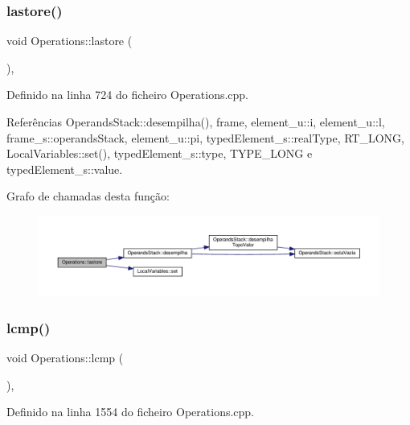 \subsubsection{\texorpdfstring{lastore()}{lastore()}}
{\footnotesize\ttfamily void Operations\+::lastore (\begin{DoxyParamCaption}{ }\end{DoxyParamCaption})\hspace{0.3cm}{\ttfamily [static]}, {\ttfamily [private]}}



Definido na linha 724 do ficheiro Operations.\+cpp.



Referências Operands\+Stack\+::desempilha(), frame, element\+\_\+u\+::i, element\+\_\+u\+::l, frame\+\_\+s\+::operands\+Stack, element\+\_\+u\+::pi, typed\+Element\+\_\+s\+::real\+Type, R\+T\+\_\+\+L\+O\+NG, Local\+Variables\+::set(), typed\+Element\+\_\+s\+::type, T\+Y\+P\+E\+\_\+\+L\+O\+NG e typed\+Element\+\_\+s\+::value.

Grafo de chamadas desta função\+:
\nopagebreak
\begin{figure}[H]
\begin{center}
\leavevmode
\includegraphics[width=350pt]{classOperations_a562813150c331183212c11e5593b83c6_cgraph}
\end{center}
\end{figure}
\mbox{\label{classOperations_a7ad4ad0e417096686b55dde9142b830a}} 
\subsubsection{\texorpdfstring{lcmp()}{lcmp()}}
{\footnotesize\ttfamily void Operations\+::lcmp (\begin{DoxyParamCaption}{ }\end{DoxyParamCaption})\hspace{0.3cm}{\ttfamily [static]}, {\ttfamily [private]}}



Definido na linha 1554 do ficheiro Operations.\+cpp.



